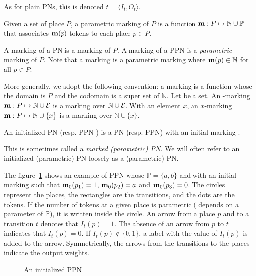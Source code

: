 As for plain \acp{PN}, this is denoted $t = \langle I_t, O_t \rangle$.

\begin{defi}
  Given a set of place $P$, a parametric marking of $P$ is a function $\mathbf{m} : P \mapsto \mathbb{N} \cup \mathbb{P} $ that associates $\mathbf{m}(p)$ tokens to each place $p \in P$.
\end{defi}

A marking of a \ac{PN} \NPT is a marking of $P$.
A marking of a \ac{PPN} \SPTP is a \emph{parametric} marking of $P$.
Note that a marking \mar is a parametric marking where $\mathbf{m}(p) \in \mathbb{N}$ for all $p \in P$.

More generally, we adopt the following convention:
a marking is a function whose the domain is $P$ and the codomain is a super set of $\mathbb{N}$.
Let \set be a set. An \set-marking $\mathbf{m} : P \mapsto \mathbb{N} \cup \mathcal{E}$ is a marking over $\mathbb{N} \cup \mathcal{E}$.
With an element $x$, an $x$-marking $\mathbf{m} : P \mapsto \mathbb{N} \cup \{x\}$ is a marking over $\mathbb{N} \cup \{x\}$.

\begin{defi}
  An initialized \ac{PN} \NPTm (resp. \ac{PPN} \SPTPm) is a \ac{PN} (resp. \ac{PPN}) with an initial marking \mari.
\end{defi}

This is sometimes called a \emph{marked (parametric) \ac{PN}}.
We will often refer to an initialized (parametric) \ac{PN} loosely as a (parametric) \ac{PN}.

The figure~\ref{fig:parametric-petri-net-example} shows an example of \ac{PPN} whose $\mathbb{P} = \{a, b\}$ and with an initial marking \mari such that $\mathbf{m}_0(p_1) = 1$, $\mathbf{m}_0(p_2) = a$ and $\mathbf{m}_0(p_3) = 0$. The circles represent the places, the rectangles are the transitions, and the dots are the tokens. If the number of tokens at a given place is parametric ( depends on a parameter of $\mathbb{P}$), it is written inside the circle. An arrow from a place $p$ and to a transition $t$ denotes that $I_t(p) = 1$. The absence of an arrow from $p$ to $t$ indicates that $I_t(p) = 0$. If $I_t(p) \notin \{0, 1\}$, a label with the value of $I_t(p)$ is added to the arrow.
Symmetrically, the arrows from the transitions to the places indicate the output weights.

\begin{figure}[htbp]
  \centering
  
  \par
  \caption{An initialized \ac{PPN}}
  \label{fig:parametric-petri-net-example}
\end{figure}


